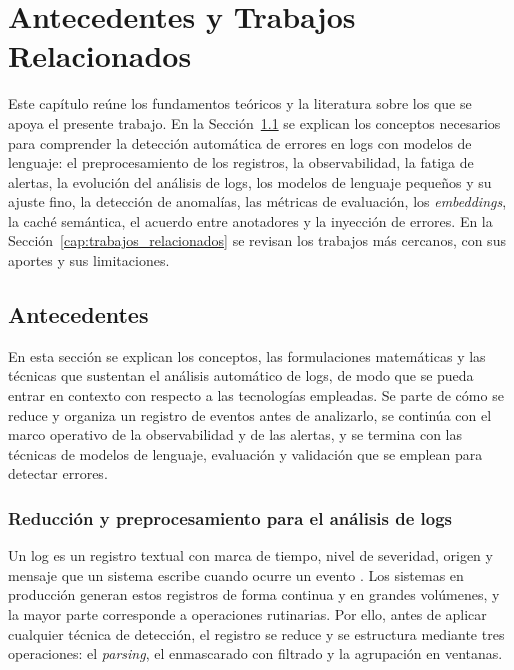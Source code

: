 \chapter{Antecedentes y Trabajos Relacionados} \label{cap:antecedentes}

Este capítulo reúne los fundamentos teóricos y la literatura sobre los que se apoya el presente trabajo. En la Sección~\ref{sec:antecedentes} se explican los conceptos necesarios para comprender la detección automática de errores en logs con modelos de lenguaje: el preprocesamiento de los registros, la observabilidad, la fatiga de alertas, la evolución del análisis de logs, los modelos de lenguaje pequeños y su ajuste fino, la detección de anomalías, las métricas de evaluación, los \textit{embeddings}, la caché semántica, el acuerdo entre anotadores y la inyección de errores. En la Sección~\ref{cap:trabajos_relacionados} se revisan los trabajos más cercanos, con sus aportes y sus limitaciones.

\section{Antecedentes}\label{sec:antecedentes}

En esta sección se explican los conceptos, las formulaciones matemáticas y las técnicas que sustentan el análisis automático de logs, de modo que se pueda entrar en contexto con respecto a las tecnologías empleadas. Se parte de cómo se reduce y organiza un registro de eventos antes de analizarlo, se continúa con el marco operativo de la observabilidad y de las alertas, y se termina con las técnicas de modelos de lenguaje, evaluación y validación que se emplean para detectar errores.

\subsection{Reducción y preprocesamiento para el análisis de logs}\label{sec:ant_preprocesamiento}

Un log es un registro textual con marca de tiempo, nivel de severidad, origen y mensaje que un sistema escribe cuando ocurre un evento \cite{he2021_survey}. Los sistemas en producción generan estos registros de forma continua y en grandes volúmenes, y la mayor parte corresponde a operaciones rutinarias. Por ello, antes de aplicar cualquier técnica de detección, el registro se reduce y se estructura mediante tres operaciones: el \textit{parsing}, el enmascarado con filtrado y la agrupación en ventanas.

